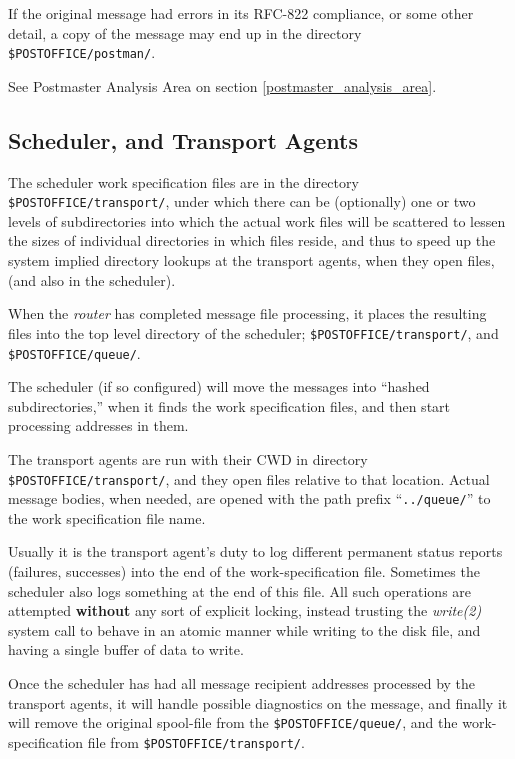 If the original message had errors in its RFC-822 compliance,
or some other detail, a copy of the message may end up in the 
directory {\tt \$POSTOFFICE/postman/}.  

See Postmaster Analysis Area on section \vref{postmaster_analysis_area}.

\subsection{Scheduler, and Transport Agents}


The scheduler work specification files are in the directory
{\tt \$POSTOFFICE/transport/}, under which there can be (optionally)
one or two levels of subdirectories into which the actual
work files will be scattered to lessen the sizes of individual
directories in which files reside, and thus to speed up the
system implied directory lookups at the transport agents, when
they open files, (and also in the scheduler).

When the {\em router} has completed message file processing, it places the
resulting files into the top level directory of the scheduler; 
{\tt \$POSTOFFICE/transport/}, and {\tt \$POSTOFFICE/queue/}.

The scheduler (if so configured) will move the messages into 
``hashed subdirectories,'' when it finds the work specification files, 
and then start processing addresses in them.

The transport agents are run with their CWD in directory 
{\tt \$POSTOFFICE/transport/}, 
and they open files relative to that location. Actual message bodies, when 
needed, are opened with the path prefix ``{\tt ../queue/}'' to the work 
specification file name.

Usually it is the transport agent's duty to log different permanent status reports 
(failures, successes) into the end of the work-specification file.  
Sometimes the scheduler also logs something at the end of this file.  
All such operations are attempted {\bf without} any sort 
of explicit locking, instead trusting the {\em write(2)} system call to 
behave in an atomic manner while writing to the disk file, and 
having a single buffer of data to write.

Once the scheduler has had all message recipient addresses 
processed by the transport agents, it will handle possible
diagnostics on the message, and finally it will remove the
original spool-file from the {\tt \$POSTOFFICE/queue/}, and 
the work-specification file from {\tt \$POSTOFFICE/transport/}.




